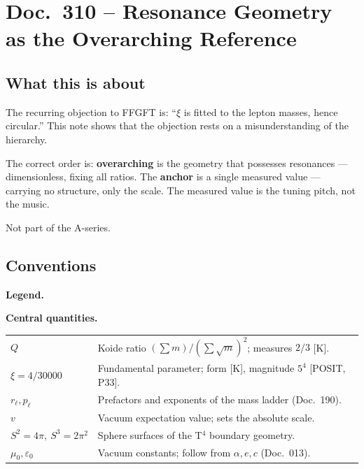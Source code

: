 \maketitle
\tableofcontents

\chapter*{Doc.~310 -- Resonance Geometry as the Overarching Reference}

\section*{What this is about}

The recurring objection to FFGFT is: ``$\xi$ is fitted to the lepton
masses, hence circular.'' This note shows that the objection rests on a
misunderstanding of the hierarchy.

The correct order is: \textbf{overarching} is the geometry that
possesses resonances — dimensionless, fixing all ratios. The
\textbf{anchor} is a single measured value — carrying no structure, only
the scale. The measured value is the tuning pitch, not the music.

Not part of the A-series.

\section*{Conventions}

\noindent\textbf{Legend.}

\medskip


\medskip
\noindent\textbf{Central quantities.}

\medskip
\begin{tabular}{@{}lp{10.5cm}}
$Q$ & Koide ratio $(\sum m)/(\sum\sqrt m)^2$; measures $2/3$ [K]. \\[4pt]
$\xi = 4/30000$ & Fundamental parameter; form [K], magnitude $5^4$ [POSIT, P33]. \\[4pt]
$r_\ell, p_\ell$ & Prefactors and exponents of the mass ladder (Doc.~190). \\[4pt]
$v$ & Vacuum expectation value; sets the absolute scale. \\[4pt]
$S^2 = 4\pi,\ S^3 = 2\pi^2$ & Sphere surfaces of the T$^4$ boundary geometry. \\[4pt]
$\mu_0,\varepsilon_0$ & Vacuum constants; follow from $\alpha,e,c$ (Doc.~013). \\
\end{tabular}

